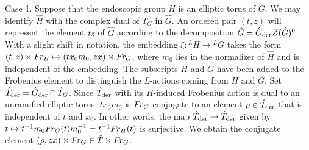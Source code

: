 Case 1.  Suppose that the endoscopic group $H$
is an elliptic torus of $G$.  We may identify $\hat H$ with 
the complex dual of $T_G$ in $\hat G$.
An ordered pair $(t,z)$ will
represent the element $tz$ of $\hat G$ 
according to the decomposition $\hat G =\hat G_{\text{der}} Z(\hat G)^0$.
With a slight shift in notation,
the embedding
$\xi:{}^L\!H\to{}^L\!G$ takes the form $(t,z)\rtimes\text{$F\hskip-.1em r_H$}\mapsto (tx_0m_0,zx)\rtimes \text{$F\hskip-.1em r_G$}$,
where $m_0$ lies in the normalizer of $\hat H$ 
and is independent of the embedding.
The subscripts $H$ and $G$ have been added to the Frobenius element to
distinguish the $L$-actions coming from $H$ and $G$.  
Set $\hat T_{\text{der}}=\hat G_{\text{der}}\cap \hat T_G$.
Since $\hat T_{\text{der}}$ with its $H$-induced Frobenius action
is dual to an unramified elliptic torus, 
$tx_0m_0$ is $\text{$F\hskip-.1em r_G$}$-conjugate to an element $\rho\in\hat T_{\text{der}}$
that is independent of $t$ and $x_0$.  In other words, 
the map $\hat T_{\text{der}} \to
\hat T_{\text{der}}$ given by $t\mapsto t^{-1}m_0\text{$F\hskip-.1em r_G$}(t)m_0^{-1}
= t^{-1}\text{$F\hskip-.1em r_H$}(t)$ is surjective.
We obtain the conjugate element $(\rho,zx)\rtimes\text{$F\hskip-.1em r_G$}\in \hat T\rtimes\text{$F\hskip-.1em r_G$}$.

